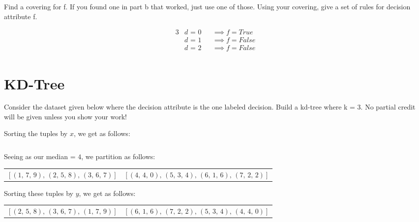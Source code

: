 \documentclass[12pt]{scrartcl}
\begin{document}
\begin{statement}
    Find a covering for f. If you found one in part b that worked, just use one of those. Using your covering, give a set of rules for decision attribute f.
\end{statement}
\begin{alignat*}{3}
    &\text{$d$ = 0}  &&\implies \text{$f = True$} \\
    &\text{$d$ = 1}  &&\implies \text{$f = False$} \\
    &\text{$d$ = 2}  &&\implies \text{$f = False$} \\
\end{alignat*}

\section{KD-Tree}
\begin{statement}
    Consider the dataset given below where the decision attribute is the one labeled decision. Build a kd-tree where k = 3. No partial credit will be given unless you show your work!
\end{statement}
\small
Sorting the tuples by $x$, we get as follows:

\begin{equation*}
    [(1,\, 7,\, 9),\, (2,\, 5,\, 8),\, (3,\, 6,\, 7),\, (4,\, 4,\, 0),\, (5,\, 3,\, 4),\, (6,\, 1,\, 6),\, (7,\, 2,\, 2)]
\end{equation*}

Seeing as our median = $4$, we partition as follows:

\begin{table}[H]
    \centering
    \begin{tabular}{cc}
        $[(1,\, 7,\, 9),\, (2,\, 5,\, 8),\, (3,\, 6,\, 7)]$ & $[(4,\, 4,\, 0),\, (5,\, 3,\, 4),\, (6,\, 1,\, 6),\, (7,\, 2,\, 2)]$
    \end{tabular}
\end{table}

Sorting these tuples by $y$, we get as follows:

\begin{table}[H]
    \centering
    \begin{tabular}{ll}
        $[(2,\, 5,\, 8),\, (3,\, 6,\, 7),\, (1,\, 7,\, 9)]$ & $[(6,\, 1,\, 6),\, (7,\, 2,\, 2),\, (5,\, 3,\, 4),\, (4,\, 4,\, 0)]$ \\
    \end{tabular}
\end{table}
\end{document}
